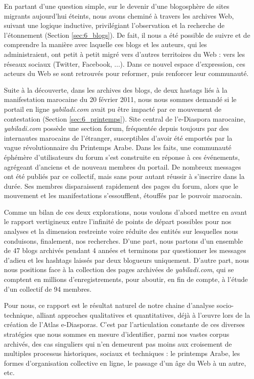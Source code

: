 \documentclass[symmetric,justified,marginals=raggedouter]{tufte-book}
\begin{document}
En partant d'une question simple, sur le devenir d'une blogosphère de sites migrants aujourd'hui éteints, nous avons cheminé à travers les archives Web, suivant une logique inductive, privilégiant l'observation et la recherche de l'étonnement (Section \ref{sec:6_blogs}). De fait, il nous a été possible de suivre et de comprendre la manière avec laquelle ces blogs et les auteurs, qui les administraient, ont petit à petit migré vers d'autres territoires du Web : vers les réseaux sociaux (Twitter, Facebook, ...). Dans ce nouvel espace d'expression, ces acteurs du Web se sont retrouvés pour reformer, puis renforcer leur communauté. 

Suite à la découverte, dans les archives des blogs, de deux hastags liés à la manifestation marocaine du 20 février 2011, nous nous sommes demandé si le portail en ligne \textit{yabiladi.com} avait pu être impacté par ce mouvement de contestation (Section \ref{sec:6_printemps}). Site central de l'e-Diaspora marocaine, \textit{yabiladi.com} possède une section forum, fréquentée depuis toujours par des internautes marocains de l'étranger, susceptibles d'avoir été emportés par la vague révolutionnaire du Printemps Arabe. Dans les faits, une communauté éphémère d'utilisateurs du forum s'est construite en réponse à ces événements, agrégeant d'anciens et de nouveau membres du portail. De nombreux messages ont été publiés par ce collectif, mais sans pour autant réussir à s'inscrire dans la durée. Ses membres disparaissent rapidement des pages du forum, alors que le mouvement et les manifestations s'essoufflent, étouffés par le pouvoir marocain. 

Comme un bilan de ces deux explorations, nous voulons d'abord mettre en avant le rapport vertigineux entre l'infinité de points de départ possibles pour nos analyses et la dimension restreinte voire réduite des entités sur lesquelles nous conduisons, finalement, nos recherches. D'une part, nous partons d'un ensemble de 47 blogs archi\-vés pendant 4 années et terminons par questionner les messages d'adieu et les hashtags laissés par deux blogueurs uniquement. D'autre part, nous nous positions face à la collection des pages archivées de \textit{yabiladi.com}, qui se comptent en millions d'enregistrements, pour aboutir, en fin de compte, à l'étude d'un collectif de 94 membres. 

Pour nous, ce rapport est le résultat naturel de notre chaine d'analyse socio-technique, alliant approches qualitatives et quantitatives, déjà à l'œuvre lors de la création de l'Atlas e-Diasporas. C'est par l'articulation constante de ces diverses stratégies que nous sommes en mesure d'iden\-tifier, parmi nos vastes corpus archivés, des cas singuliers qui n'en demeurent pas moins aux croisement de multiples processus historiques, sociaux et techniques : le printemps Arabe, les formes d'organisation collective en ligne, le passage d'un âge du Web à un autre, etc. 
\end{document}
